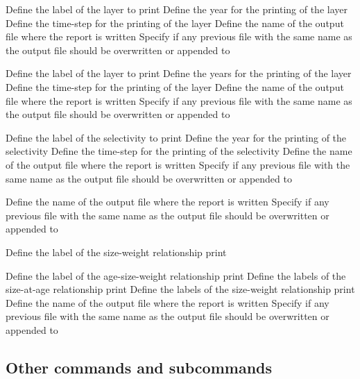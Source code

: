  {Define the label of the layer to print}
 {Define the year for the printing of the layer}
 {Define the time-step for the printing of the layer}
 {Define the name of the output file where the report is written}
 {Specify if any previous file with the same name as the output file should be overwritten or appended to}
\par\textbf{}\par
{} {Define the label of the layer to print}
 {Define the years for the printing of the layer}
 {Define the time-step for the printing of the layer}
 {Define the name of the output file where the report is written}
 {Specify if any previous file with the same name as the output file should be overwritten or appended to}
\par\textbf{}\par
{} {Define the label of the selectivity to print}
 {Define the year for the printing of the selectivity}
 {Define the time-step for the printing of the selectivity}
 {Define the name of the output file where the report is written}
 {Specify if any previous file with the same name as the output file should be overwritten or appended to}
\par\textbf{}\par
{} {Define the name of the output file where the report is written}
 {Specify if any previous file with the same name as the output file should be overwritten or appended to}
\par\textbf{}\par
{} {Define the label of the size-weight relationship print}
\par\textbf{}\par
{} {Define the label of the age-size-weight relationship print}
 {Define the labels of the size-at-age relationship print}
 {Define the labels of the size-weight relationship print}
 {Define the name of the output file where the report is written}
 {Specify if any previous file with the same name as the output file should be overwritten or appended to}
\subsection{Other commands and subcommands}\par
{}\par\par
